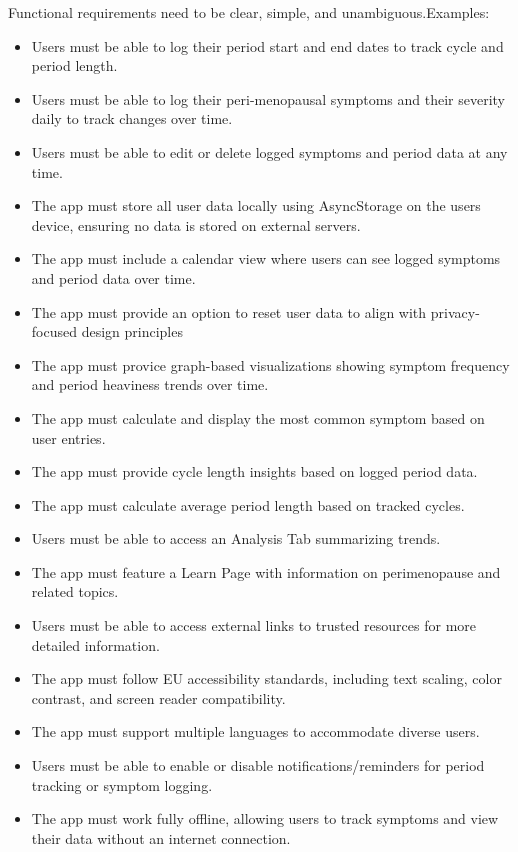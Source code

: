 Functional requirements need to be clear, simple, and unambiguous.Examples:
\begin{itemize}
      \item Users must be able to log their period start and end dates to track cycle and period length.
      \item Users must be able to log their peri-menopausal symptoms and their severity daily to track changes over time.
      \item Users must be able to edit or delete logged symptoms and period data at any time.
      \item The app must store all user data locally using AsyncStorage on the users device, ensuring no data is stored on external servers.
      \item The app must include a calendar view where users can see logged symptoms and period data over time.
      \item The app must provide an option to reset user data to align with privacy-focused design principles
      \item The app must provice graph-based visualizations showing symptom frequency and period heaviness trends over time.
      \item The app must calculate and display the most common symptom based on user entries.
      \item The app must provide cycle length insights based on logged period data.
      \item The app must calculate average period length based on tracked cycles.
      \item Users must be able to access an Analysis Tab summarizing trends.
      \item The app must feature a Learn Page with information on perimenopause and related topics.
      \item Users must be able to access external links to trusted resources for more detailed information.
      \item The app must follow EU accessibility standards, including text scaling, color contrast, and screen reader compatibility.
      \item The app must support multiple languages to accommodate diverse users.
      \item Users must be able to enable or disable notifications/reminders for period tracking or symptom logging.
      \item The app must work fully offline, allowing users to track symptoms and view their data without an internet connection.
      
      
\end{itemize}


